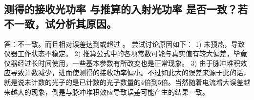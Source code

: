 \documentclass[a4paper]{article}
\begin{document}
\subsection{测得的接收光功率 与推算的入射光功率 是否一致？若不一致，试分析其原因。}
答：不一致。而且相对误差达到或超过 。
尝试讨论原因如下：
1)	未预热，导致仪器工作状态不稳定。
2)	推算公式中的各项常数可能与真实值有较大偏差，毕竟仪器经过长时间使用，一些基本参数有所改变也是正常现象。
3)	由于脉冲堆积效应导致计数减少，进而使测得的接收功率偏小。不过如此大的误差来源于此的话，就是说未计数的光子的是已计数的光子数量的4倍到5倍。当然随着电流增大误差越来越大的现象，倒是与脉冲堆积效应导致误差可能产生的结果一致。

\nocite{jiaocai}

\end{document}
